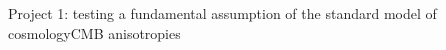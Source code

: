 \documentclass{beamer}
\begin{document}
\begin{frame}{Project 1: testing a fundamental assumption of the standard model of cosmology}{CMB anisotropies}
\begin{figure}[hbtp]
\end{figure}
\end{frame}
\end{document}
